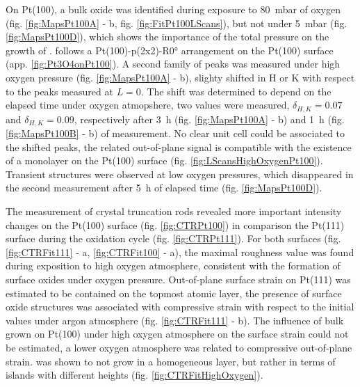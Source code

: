 On Pt(100), a bulk  oxide was identified during exposure to \qty{80}{\milli\bar} of oxygen (fig. \ref{fig:MapsPt100A} - b, fig. \ref{fig:FitPt100LScans}), but not under \qty{5}{\milli\bar} (fig. \ref{fig:MapsPt100D}), which shows the importance of the total pressure on the growth of .
 follows a Pt(100)-p(2x2)-R\ang{0} arrangement on the Pt(100) surface (app. \ref{fig:Pt3O4onPt100}).
A second family of peaks was measured under high oxygen pressure (fig. \ref{fig:MapsPt100A} - b), slighty shifted in H or K with respect to the  peaks measured at $L=0$.
The shift was determined to depend on the elapsed time under oxygen atmopshere, two values were measured, $\delta_{H,K}=0.07$ and $\delta_{H,K}=0.09$, respectively after \qty{3}{\hour} (fig. \ref{fig:MapsPt100A} - b) and \qty{1}{\hour} (fig. \ref{fig:MapsPt100B} - b) of measurement.
No clear unit cell could be associated to the shifted peaks, the related out-of-plane signal is compatible with the existence of a monolayer on the Pt(100) surface (fig. \ref{fig:LScansHighOxygenPt100}).
Transient structures were observed at low oxygen pressures, which disappeared in the second measurement after \qty{5}{\hour} of elapsed time (fig. \ref{fig:MapsPt100D}).

The measurement of crystal truncation rods revealed more important intensity changes on the Pt(100) surface (fig. \ref{fig:CTRPt100}) in comparison the Pt(111) surface during the oxidation cycle (fig. \ref{fig:CTRPt111}).
For both surfaces (fig. \ref{fig:CTRFit111} - a, \ref{fig:CTRFit100} - a), the maximal roughness value was found during exposition to high oxygen atmosphere, consistent with the formation of surface oxides under oxygen pressure.
Out-of-plane surface strain on Pt(111) was estimated to be contained on the topmost atomic layer, the presence of surface oxide structures was associated with compressive strain with respect to the initial values under argon atmosphere (fig. \ref{fig:CTRFit111} - b).
The influence of bulk  grown on Pt(100) under high oxygen atmosphere on the surface strain could not be estimated, a lower oxygen atmosphere was related to compressive out-of-plane strain.
 was shown to not grow in a homogeneous layer, but rather in terms of islands with different heights (fig. \ref{fig:CTRFitHighOxygen}).

